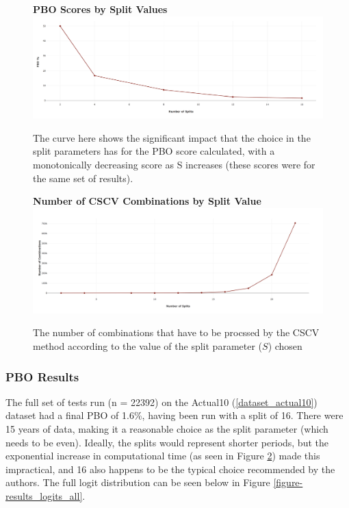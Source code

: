 \documentclass[a4paper,11pt,oneside]{article}
\theoremstyle{plain}
\theoremstyle{definition}
\begin{document}
\begin{figure}[H]
	\centering 
	\textbf{PBO Scores by Split Values}
	\includegraphics[scale=0.25]{images/results/pbo/PBO_by_Split.png} 
	\caption{
		\newline The curve here shows the significant impact that the choice in the split parameters has for the PBO score calculated, with a monotonically decreasing score as S increases (these scores were for the same set of results). }
	\label{figure-PBO_by_Split}
\end{figure}

\begin{figure}[H]
	\centering 
	\textbf{Number of CSCV Combinations by Split Value}
	\includegraphics[scale=0.25]{images/results/pbo/combination_sizes.png} 
	\caption{
		\newline The number of combinations that have to be procssed by the CSCV method according to the value of the split parameter ($S$) chosen}
	\label{figure-s_combinations}
\end{figure}


\subsubsection{PBO Results}

The full set of tests run (n = 22392) on the Actual10 (\ref{dataset_actual10}) dataset had a final PBO of 1.6\%, having been run with a split of 16. There were 15 years of data, making it a reasonable choice as the split parameter (which needs to be even). Ideally, the splits would represent shorter periods, but the exponential increase in computational time (as seen in Figure \ref{figure-s_combinations}) made this impractical, and 16 also happens to be the typical choice recommended by the authors. The full logit distribution can be seen below in Figure \ref{figure-results_logits_all}.
\end{document}
